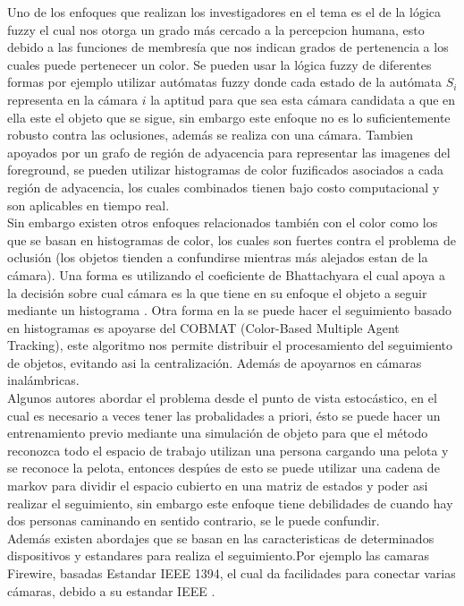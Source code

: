 \documentclass[conference]{IEEEtran}
\begin{document}
Uno de los enfoques que realizan los investigadores en el tema es el de la l\'ogica fuzzy el cual nos otorga un grado m\'as cercado a la percepcion humana, esto debido a las funciones de membres\'ia que nos indican grados de pertenencia  a los cuales puede pertenecer un color. Se pueden usar la l\'ogica fuzzy de diferentes formas por ejemplo utilizar aut\'omatas fuzzy donde cada estado de la aut\'omata $S_i$ representa en la c\'amara $i$ la aptitud para que sea esta c\'amara candidata a que en ella este el objeto que se sigue\cite{morioka_mul}, sin embargo este enfoque no es lo suficientemente robusto contra las oclusiones, adem\'as se  realiza con una c\'amara. Tambien apoyados por un grafo de regi\'on de adyacencia para representar las imagenes del foreground, se pueden utilizar histogramas de color fuzificados asociados a cada regi\'on de adyacencia, los cuales combinados tienen bajo costo computacional y son aplicables en tiempo real\cite{hossiein_mul}.\\
Sin embargo existen otros enfoques relacionados tambi\'en  con el color como los que se basan en  histogramas de color, los cuales son fuertes contra el problema de oclusi\'on (los objetos tienden a confundirse mientras m\'as alejados estan de la c\'amara). Una forma es utilizando el coeficiente de Bhattachyara el cual apoya a la decisi\'on sobre cual c\'amara es la que tiene en su enfoque el objeto a seguir mediante un histograma \cite{nummiaro_mot}. Otra forma en la se puede hacer el seguimiento basado en histogramas es apoyarse del COBMAT (Color-Based Multiple Agent Tracking), este algoritmo nos permite distribuir el procesamiento del seguimiento de objetos, evitando asi la centralizaci\'on. Adem\'as de apoyarnos en c\'amaras inal\'ambricas\cite{oto_mul}.  \\
Algunos autores abordar el problema desde el punto de vista estoc\'astico,  en el cual es necesario a veces tener las probalidades a priori, \'esto se puede hacer un entrenamiento previo mediante una simulaci\'on de objeto para que el m\'etodo reconozca todo el espacio de trabajo utilizan una persona cargando una pelota y se reconoce la pelota, entonces desp\'ues de esto se puede utilizar una cadena de markov para dividir el espacio cubierto en una matriz de estados  y poder asi realizar el seguimiento\cite{Dick_mot}, sin embargo este enfoque tiene debilidades de cuando hay dos personas caminando en sentido contrario, se le puede confundir. \\
Adem\'as existen abordajes que se basan en las caracteristicas de determinados dispositivos y estandares para realiza el seguimiento.Por ejemplo las camaras Firewire, basadas Estandar IEEE 1394, el cual da facilidades para conectar varias c\'amaras, debido a su estandar IEEE \cite{kumar_mot}.\\
\end{document}
